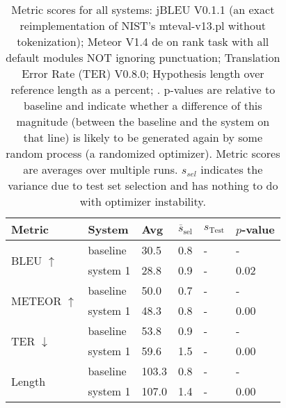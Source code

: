 \begin{table}[htb]
\begin{center}
\begin{footnotesize}
\begin{tabular}{|l|l|l|l|l|l|}
\hline
\bf Metric & \bf System & \bf Avg & \bf $\overline{s}_{\text{sel}}$ & \bf $s_{\text{Test}}$ & \bf $p$-value \\
\hline
\multirow{2}{*}{BLEU $\uparrow$}
& baseline & 30.5 & 0.8 & - & - \\
& system 1 & 28.8 & 0.9 & - & 0.02 \\
\hline
\multirow{2}{*}{METEOR $\uparrow$}
& baseline & 50.0 & 0.7 & - & - \\
& system 1 & 48.3 & 0.8 & - & 0.00 \\
\hline
\multirow{2}{*}{TER $\downarrow$}
& baseline & 53.8 & 0.9 & - & - \\
& system 1 & 59.6 & 1.5 & - & 0.00 \\
\hline
\multirow{2}{*}{Length }
& baseline & 103.3 & 0.8 & - & - \\
& system 1 & 107.0 & 1.4 & - & 0.00 \\
\hline
\end{tabular}
\end{footnotesize}
\end{center}
\caption{\label{tab:scores} Metric scores for all systems: jBLEU V0.1.1 (an exact reimplementation of NIST's mteval-v13.pl without tokenization); Meteor V1.4 de on rank task with all default modules NOT ignoring punctuation; Translation Error Rate (TER) V0.8.0; Hypothesis length over reference length as a percent; . p-values are relative to baseline and indicate whether a difference of this magnitude (between the baseline and the system on that line) is likely to be generated again by some random process (a randomized optimizer). Metric scores are averages over multiple runs. $s_{sel}$ indicates the variance due to test set selection and has nothing to do with optimizer instability.}
\end{table}
